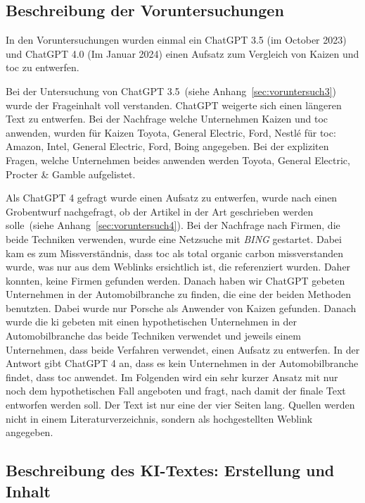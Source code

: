 
\subsection{Beschreibung der Voruntersuchungen}

In den Voruntersuchungen wurden einmal ein ChatGPT 3.5 (im October 2023) und ChatGPT 4.0 (Im Januar 2024)
einen Aufsatz zum Vergleich von Kaizen und \gls{toc} zu entwerfen.

Bei der Untersuchung von ChatGPT 3.5~(siehe Anhang~\ref{sec:voruntersuch3}) wurde der Frageinhalt voll verstanden. ChatGPT weigerte sich einen längeren Text zu entwerfen.
Bei der Nachfrage welche Unternehmen Kaizen und \gls{toc} anwenden, wurden für Kaizen Toyota, General Electric, Ford, Nestlé  für \gls{toc}: Amazon, Intel, General Electric, Ford, Boing angegeben. Bei der expliziten Fragen, welche Unternehmen beides anwenden werden Toyota, General Electric, Procter \& Gamble aufgelistet.

Als ChatGPT 4 gefragt wurde einen Aufsatz zu entwerfen, wurde nach einen Grobentwurf nachgefragt, ob der Artikel in der Art geschrieben werden solle~(siehe Anhang~\ref{sec:voruntersuch4}). Bei der Nachfrage nach Firmen, die beide Techniken verwenden, wurde eine Netzsuche mit \textit{BING} gestartet. Dabei kam es zum Missverständnis, dass \gls{toc} als total organic carbon missverstanden wurde, was nur aus dem Weblinks ersichtlich ist, die referenziert wurden. Daher konnten, keine Firmen gefunden werden. Danach haben wir ChatGPT gebeten Unternehmen in der Automobilbranche zu finden, die eine der beiden Methoden benutzten. Dabei wurde nur Porsche als Anwender von Kaizen gefunden. Danach wurde die \gls{ki} gebeten mit einen hypothetischen Unternehmen in der Automobilbranche das beide Techniken verwendet und jeweils einem Unternehmen, dass beide Verfahren verwendet, einen Aufsatz zu entwerfen. In der Antwort gibt ChatGPT 4 an, dass es kein Unternehmen in der Automobilbranche findet, dass \gls{toc} anwendet. Im Folgenden wird ein sehr kurzer Ansatz mit nur noch dem hypothetischen Fall angeboten und fragt, nach damit der finale Text entworfen werden soll. Der Text ist nur eine der vier Seiten lang. Quellen werden nicht in einem Literaturverzeichnis, sondern als hochgestellten Weblink angegeben.

\subsection{Beschreibung des KI-Textes: Erstellung und Inhalt}

